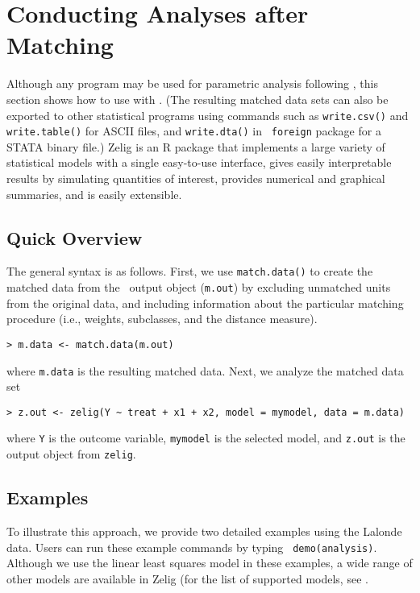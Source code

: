 \section{Conducting Analyses after Matching}
\label{sec:analysis}

Although any program may be used for parametric analysis following
\MatchIt, this section shows how to use
 with \MatchIt.  (The
resulting matched data sets can also be exported to other statistical
programs using commands such as {\tt write.csv()} and {\tt
  write.table()} for ASCII files, and {\tt write.dta()} in {\tt
  foreign} package for a STATA binary file.)  Zelig
\citep{ImaKinLau04} is an R package that implements a large variety of
statistical models with a single easy-to-use interface, gives easily
interpretable results by simulating quantities of interest, provides
numerical and graphical summaries, and is easily extensible.

\subsection{Quick Overview}

The general syntax is as follows. First, we use \texttt{match.data()}
to create the matched data from the \MatchIt\ output object
(\texttt{m.out}) by excluding unmatched units from the original data,
and including information about the particular matching procedure
(i.e., weights, subclasses, and the distance measure).
\begin{verbatim}
> m.data <- match.data(m.out)
\end{verbatim}
where {\tt m.data} is the resulting matched data.  Next, we analyze
the matched data set
\begin{verbatim}
> z.out <- zelig(Y ~ treat + x1 + x2, model = mymodel, data = m.data)
\end{verbatim}
where {\tt Y} is the outcome variable, {\tt mymodel} is the selected
model, and {\tt z.out} is the output object from {\tt zelig}.

\subsection{Examples}

To illustrate this approach, we provide two detailed examples using
the Lalonde data. Users can run these example commands by typing {\tt
  demo(analysis)}. Although we use the linear least squares model in
these examples, a wide range of other models are available in Zelig
(for the list of supported models, see
.

